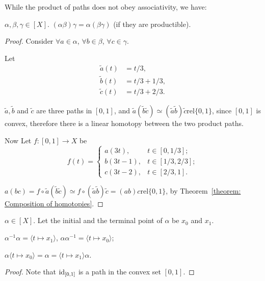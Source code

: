 \documentclass[openany, oneside, a5paper]{book}
\newcommand*{\rel}{\mathbin{\mathrm{rel}}}
\newcommand*{\pclass}[1]{\langle{#1}\rangle}    %
\begin{document}
While the product of paths does not obey associativity, we have:
\begin{theorem}%
    \label{theorem: Associativity of product of path classes}
    $\alpha, \beta, \gamma \in [X]$. $(\alpha \beta) \gamma = \alpha (\beta \gamma)$ (if they are productible).
\end{theorem}
\begin{proof}
    Consider $\forall a \in \alpha$, $\forall b \in \beta$, $\forall c \in \gamma$.

    Let
    \begin{align*}
        \tilde a(t) &= t/3, \\
        \tilde b(t) &= t/3 + 1/3, \\
        \tilde c(t) &= t/3 + 2/3.
    \end{align*}

    $\tilde a, \tilde b$ and $\tilde c$ are three paths in $[0, 1]$, and $\tilde a (\tilde b \tilde c) \simeq (\tilde a \tilde b) \tilde c \rel \{0, 1\}$, since $[0, 1]$ is convex, therefore there is a linear homotopy between the two product paths.

    Now Let $f \colon [0, 1] \to X$ be
    \begin{equation*}
        f(t) = \begin{cases}
            a(3t), & t \in [0, 1/3]; \\
            b(3t - 1), & t \in [1/3, 2/3]; \\
            c(3t - 2), & t \in [2/3, 1].
        \end{cases}
    \end{equation*}

    $a(bc) = f \circ \tilde a (\tilde b \tilde c) \simeq f \circ (\tilde a \tilde b) \tilde c = (ab)c \rel \{0, 1\}$, by Theorem~\ref{theorem: Composition of homotopies}.
\end{proof}

\begin{theorem}%
    \label{theorem: Identity-like properties of point path}
    $\alpha \in [X]$. 
    Let the initial and the terminal point of $\alpha$ be $x_0$ and $x_1$.
    \begin{enumerate*}[label=\emph{(\roman*)}] %
        \item $\alpha^{-1} \alpha = \pclass{t \mapsto x_1}$, $\alpha \alpha^{-1} = \pclass{t \mapsto x_0}$;
        \item $\alpha \pclass{t \mapsto x_0} = \alpha = \pclass{t \mapsto x_1}\alpha$.
    \end{enumerate*}
\end{theorem}
\begin{proof}
    Note that $\operatorname{id}_{[0, 1]}$ is a path in the convex set $[0, 1]$.
\end{proof}
\end{document}
